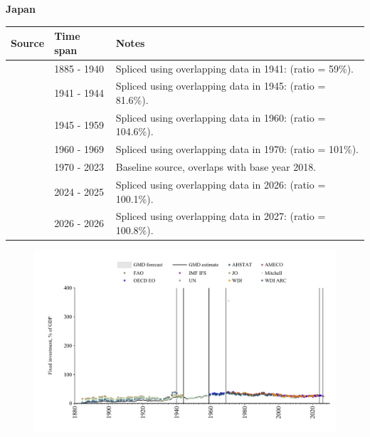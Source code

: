 \documentclass[12pt,a4paper,landscape]{article}
\begin{document}
\begin{adjustbox}{max totalsize={\paperwidth}{\paperheight},center}
\begin{minipage}[t][\textheight][t]{\textwidth}
\vspace*{0.5cm}
{}
\begin{center}
{\Large\bfseries Japan}
\end{center}
\vspace{0.5cm}
\begin{table}[H]
\centering
\small
\begin{tabular}{|l|l|l|}
\hline
\textbf{Source} & \textbf{Time span} & \textbf{Notes} \\
\hline
\rowcolor{white}\cite{AHSTAT}& 1885 - 1940 &Spliced using overlapping data in 1941: (ratio = 59\%).\\
\rowcolor{lightgray}\cite{JO}& 1941 - 1944 &Spliced using overlapping data in 1945: (ratio = 81.6\%).\\
\rowcolor{white}\cite{Mitchell}& 1945 - 1959 &Spliced using overlapping data in 1960: (ratio = 104.6\%).\\
\rowcolor{lightgray}\cite{OECD_EO}& 1960 - 1969 &Spliced using overlapping data in 1970: (ratio = 101\%).\\
\rowcolor{white}\cite{WDI}& 1970 - 2023 &Baseline source, overlaps with base year 2018.\\
\rowcolor{lightgray}\cite{OECD_EO}& 2024 - 2025 &Spliced using overlapping data in 2026: (ratio = 100.1\%).\\
\rowcolor{white}\cite{AMECO}& 2026 - 2026 &Spliced using overlapping data in 2027: (ratio = 100.8\%).\\
\hline
\end{tabular}
\end{table}
\begin{figure}[H]
\centering
\includegraphics[width=\textwidth,height=0.6\textheight,keepaspectratio]{graphs/JPN_finv_GDP.pdf}
\end{figure}
\end{minipage}
\end{adjustbox}
\end{document}

